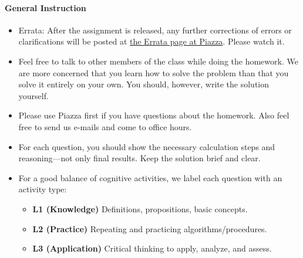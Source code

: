 \paragraph*{General Instruction}
\begin{itemize}\vspace{-2mm}\setlength\itemsep{0mm}
	\item Errata: After the assignment is released, any further corrections of errors or clarifications will be posted at \href{https://piazza.com/class/idqujg4tiae3q0?cid=93}{the Errata page at Piazza}. Please watch it.
	\item Feel free to talk to other members of the class while doing the homework. We are more concerned that
	you learn how to solve the problem than that you solve it entirely on your own. You should, however, write the solution yourself. 
	\item Please use Piazza first if you have questions about the homework. Also feel free to send us e-mails and come to office hours. 
	\item For each question, you should show the necessary calculation steps and reasoning---not only final results. Keep the solution brief and clear.
	\item For a good balance of cognitive activities, we label each question with an activity type:
	\begin{itemize}
		\item {\bf L1 (Knowledge)} Definitions, propositions, basic concepts.
		\item {\bf L2 (Practice)} Repeating and practicing algorithms/procedures.
		\item {\bf L3 (Application)} Critical thinking to apply, analyze, and assess.
	\end{itemize}
\end{itemize}
